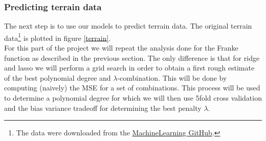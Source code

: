 \documentclass[notitlepage, reprint, nofootinbib]{revtex4-1}
\begin{document}
\subsubsection{Predicting terrain data}
The next step is to use our models to predict terrain data. The original terrain data\footnote{The data were downloaded from the \href{https://github.com/CompPhysics/MachineLearning/tree/master/doc/Projects/2020/Project1/DataFiles}{MachineLearning GitHub}.} is plotted in figure \ref{terrain}. \\[2mm]
For this part of the project we will repeat the analysis done for the Franke function as described in the previous section. The only difference is that for ridge and lasso we will perform a grid search in order to obtain a first rough estimate of the best polynomial degree and $\lambda$-combination. This will be done by computing (naively) the MSE for a set of combinations. This process will be used to determine a polynomial degree for which we will then use 5fold cross validation and the bias variance tradeoff for determining the best penalty $\lambda$.
\end{document}
